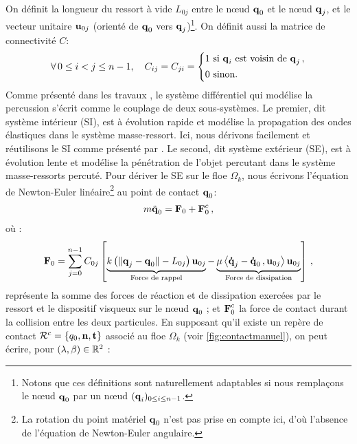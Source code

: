 \noindent On définit la longueur du ressort à vide $L_{0j}$ entre le n\oe{}ud $\bm{\mathrm{q}}_0$ et le n\oe{}ud $\bm{\mathrm{q}}_j$, et le vecteur unitaire $\bm{\mathrm{u}}_{0j}$ (orienté de $\bm{\mathrm{q}}_0$ vers $\bm{\mathrm{q}}_j$)\footnote{Notons que ces définitions sont naturellement adaptables si nous remplaçons le n\oe{}ud $\bm{\mathrm{q}}_0$ par un n\oe{}ud $(\bm{\mathrm{q}}_i)_{0 \leq i \leq n-1}$.}. On définit aussi la matrice de connectivité $C$:
\begin{align*}
    \forall \, 0 \leq i < j \leq n-1, \quad C_{ij} = C_{ji} = \begin{dcases}
    1 \text{ si } \bm{\mathrm{q}}_i \text{ est voisin de } \bm{\mathrm{q}}_j \,, \\
    0 \text{ sinon}.
\end{dcases}
\end{align*}
\noindent Comme présenté dans les travaux \parencite[p.186]{balasoiu2020halthesis}, le système différentiel qui modélise la percussion s’écrit comme le couplage de deux sous-systèmes. Le premier, dit système intérieur (SI), est à évolution rapide et modélise la propagation des ondes élastiques dans le système masse-ressort. Ici, nous dérivons facilement et réutilisons le SI comme présenté par \citeauthor{balasoiu2020halthesis}. Le second, dit système extérieur (SE), est à évolution lente et modélise la pénétration de l’objet percutant dans le système masse-ressorts percuté. Pour dériver le SE sur le floe $\Omega_k$, nous écrivons l'équation de Newton-Euler linéaire\footnote{La rotation du point matériel $\bm{\mathrm{q}}_0$ n'est pas prise en compte ici, d'où l'absence de l'équation de Newton-Euler angulaire.} au point de contact $\bm{\mathrm{q}}_0$:
\begin{align}  \label{eq:SE}
m \ddot{\bm{\mathrm{q}}}_0 = \bm{\mathrm{F}}_0 + \bm{\mathrm{F}}^c_0 \,,
\end{align}
où :
\begin{align}  \label{eq:F0}
    \bm{\mathrm{F}}_0 = \sum_{j=0}^{n-1}C_{0j} \left[  \underbrace{k \left( \Vert \bm{\mathrm{q}}_j - \bm{\mathrm{q}}_0 \Vert - L_{0j} \right) \bm{\mathrm{u}}_{0j}}_{\text{Force de rappel}} - \underbrace{\mu \left\langle \bm{\mathrm{\dot{q}}}_j - \bm{\mathrm{\dot{q}}}_0\,, \bm{\mathrm{u}}_{0j}  \right\rangle  \bm{\mathrm{u}}_{0j}}_{\text{Force de dissipation}}  \right] \,,
\end{align}
représente la somme des forces de réaction et de dissipation exercées par le ressort et le dispositif visqueux sur le n\oe{}ud $\bm{\mathrm{q}}_0$ ; et $\bm{\mathrm{F}}^c_0$ la force de contact durant la collision entre les deux particules. En supposant qu'il existe un repère de contact $\mathcal{R}^c = \{ q_0, \bm{\mathrm{n}}, \bm{\mathrm{t}} \}$ associé au floe $\Omega_k$ (voir \cref{fig:contactmanuel}), on peut écrire, pour $(\lambda, \beta) \in \mathbb{R}^2$ :
